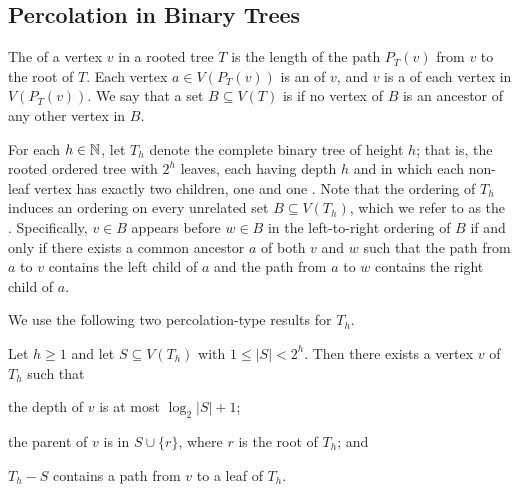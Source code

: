 \documentclass{patmorin}
\renewcommand{\le}{\leqslant}
\renewcommand{\ge}{\geqslant}
\begin{document}
\subsection{Percolation in Binary Trees}


The  of a vertex $v$ in a rooted tree $T$ is the length of the path $P_T(v)$ from $v$ to the root of $T$.  Each vertex $a\in V(P_T(v))$ is an  of $v$, and $v$ is a  of each vertex in $V(P_T(v))$.  We say that a set $B\subseteq V(T)$ is  if no vertex of $B$ is an ancestor of any other vertex in $B$.

For each $h\in\mathbb{N}$, let $T_h$ denote the complete binary tree of height $h$; that is, the rooted ordered tree with $2^h$ leaves, each having depth $h$ and in which each non-leaf vertex has exactly two children, one  and one .  Note that the ordering of $T_h$ induces an ordering on every unrelated set $B\subseteq V(T_h)$, which we refer to as the .  Specifically, $v\in B$ appears before $w\in B$ in the left-to-right ordering of $B$ if and only if there exists a common ancestor $a$ of both $v$ and $w$ such that the path from $a$ to $v$ contains the left child of $a$ and the path from $a$ to $w$ contains the right child of $a$.

We use the following two percolation-type results for $T_h$.

\begin{lem}\label{one_path}
  Let $h\ge 1$
  and let $S\subseteq V(T_h)$ with $1\le |S|< 2^h$. Then there exists a vertex $v$ of $T_h$ such that
  \begin{compactenum}[(i)]
    \item the depth of $v$ is at most $\log_2|S|+1$;
    \item the parent of $v$ is in $S\cup\{r\}$, where $r$ is the root of $T_h$; and
    \item $T_h-S$ contains a path from $v$ to a leaf of $T_h$.
  \end{compactenum}
\end{lem}
\end{document}
